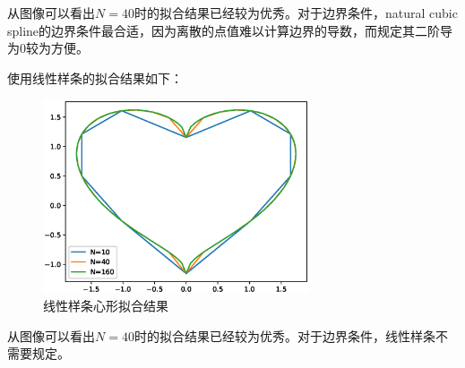\documentclass[12]{article}%
\begin{document}
        从图像可以看出$N=40$时的拟合结果已经较为优秀。对于边界条件，natural cubic spline的边界条件最合适，因为离散的点值难以计算边界的导数，而规定其二阶导为0较为方便。

        使用线性样条的拟合结果如下：
        \begin{figure}[H]
            \centering
            \includegraphics[width=0.7\textwidth]{../pic/E2.eps}
            \caption{线性样条心形拟合结果}
        \end{figure}

        从图像可以看出$N=40$时的拟合结果已经较为优秀。对于边界条件，线性样条不需要规定。
\end{document}
